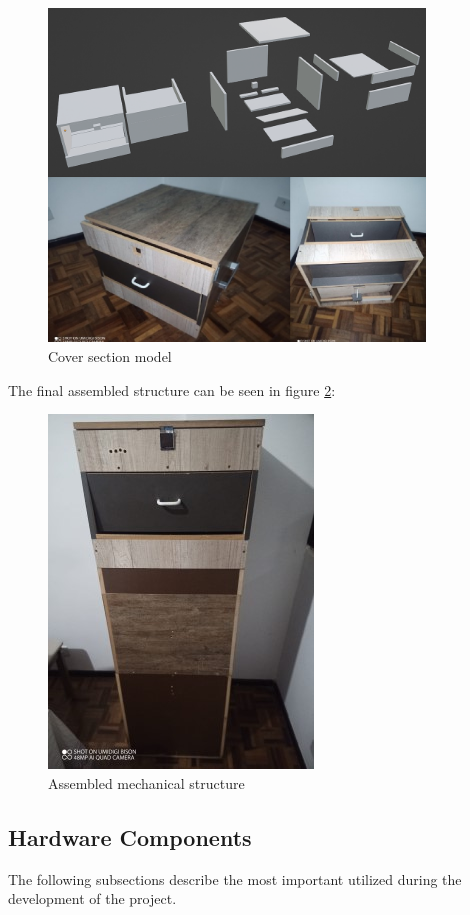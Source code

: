 \documentclass[a4paper,11pt]{article}
\begin{document}
\begin{figure}[H]
  \centering
  \includegraphics[width=10cm]{Figures/Cover Part.png}
  \caption{\small{Cover section model}}
  \label{fig:coverModel1}
\end{figure}

The final assembled structure can be seen in figure \ref{fig:fullBody}:

\begin{figure}[H]
  \centering
  \includegraphics[scale=0.7]{Figures/Full Structure.jpg}
  \caption{\small{Assembled mechanical structure}}
  \label{fig:fullBody}
\end{figure}

\subsection{Hardware Components}
\label{subsec:Hardware}
The following subsections describe the most important utilized during the development of the project.
\end{document}
